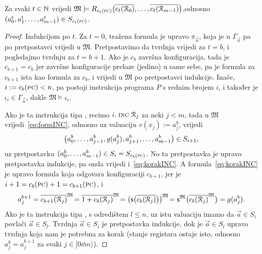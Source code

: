 \begin{lema}[{name=[izračunavanje čuva istinitost formula pojedinih konfiguracija]}]\label{lm:formcomputesteps}
Za svaki $t\in{\mathbb N}$ vrijedi $\mathfrak M\models R_{c_t(\textsc{pc})}\bigl(\overline{c_t(\mathcal R_{0})},\dotsc,\overline{c_t(\mathcal R_{m-1})}\bigr)$,\newline odnosno $(a_0^t,a_1^t,\dotsc,a_{m-1}^t)\in S_{c_t(\textsc{pc})}$.
\end{lema}
\begin{proof}
Indukcijom po $t$. Za $t=0$, tražena formula je upravo $\pi_{\vec u}$, koja je u $\Gamma_{\vec u}$ pa po pretpostavci vrijedi u $\mathfrak M$. Pretpostavimo da tvrdnja vrijedi za $t=b$, i pogledajmo tvrdnju za $t=b+1$. Ako je $c_b$ završna konfiguracija, tada je $c_{b+1}=c_b$ jer završne konfiguracije prelaze (jedino) u same sebe, pa je formula za $c_{b+1}$ ista kao formula za $c_b$, i vrijedi u $\mathfrak M$ po pretpostavci indukcije. Inače, $i:=c_b(\textsc{pc})<n$, pa postoji instrukcija programa $P$ s rednim brojem $i$, i također je $\iota_i\in\Gamma_{\vec u}$, dakle $\mathfrak M\models\iota_i$.

Ako je ta instrukcija tipa \inc, recimo $i.\;\textsc{inc}\;\mathcal R_{j}$ za neki $j<m$, tada u $\mathfrak M$ vrijedi~\eqref{eq:formINC}, odnosno uz valuaciju $v(x_j):=a_j^b$, vrijedi
\begin{equation}
\label{eq:korakINC}
	\bigl(a_0^b,\dotsc,a_{j-1}^b,g(a_j^b),a_{j+1}^b,\dotsc,a_{m-1}^b\bigr)\in S_{i+1}\text,
\end{equation} uz pretpostavku $(a_0^b,\dotsc,a_{m-1}^b)\in S_i=S_{c_b(\textsc{pc})}$. No ta pretpostavka je upravo pretpostavka indukcije, pa onda vrijedi i~\eqref{eq:korakINC}. A formula~\eqref{eq:korakINC} je upravo formula koja odgovara konfiguraciji $c_{b+1}$, jer je $i+1=c_b(\textsc{pc})+1=c_{b+1}(\textsc{pc})$, i
\begin{equation}
	a_j^{b+1}=\overline{c_{b+1}(\mathcal R_{j})}^{\mathfrak M}\!=\overline{1+c_b(\mathcal R_{j})}^{\mathfrak M}\!=\bigl(\mathsf s\bigl(\overline{c_b(\mathcal R_{j})}\bigr)\bigr)^{\mathfrak M}\!=\mathsf s^{\mathfrak M}\bigl(\overline{c_b(\mathcal R_{j})}^{\mathfrak M}\bigr)=g(a_j^b)\text.
\end{equation}
	Ako je ta instrukcija tipa \goto, s odredištem $l\le n$, uz istu valuaciju imamo da $\vec a\in S_i$ povlači $\vec a\in S_l$. Tvrdnja $\vec a\in S_i$ je pretpostavka indukcije, dok je $\vec a\in S_l$ upravo tvrdnja koja nam je potrebna za korak (stanje registara ostaje isto, odnosno $a_j^b=a_j^{b+1}$ za svaki $j\in[0\dd m\rangle$).


\end{proof}
